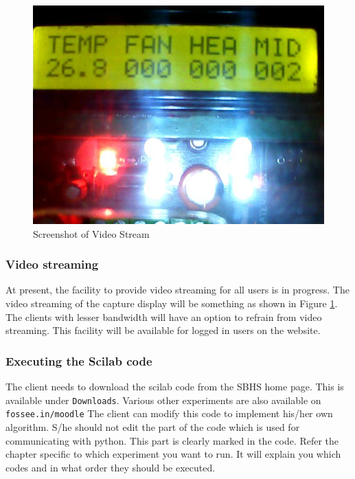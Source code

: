 \begin{figure}
  \centering
\includegraphics[width=0.7\linewidth]{IEEE-Chile/figures/display.jpg}
\caption{Screenshot of Video Stream}
\label{video}
\end{figure}
\subsubsection { Video streaming} At present, the facility to provide video streaming for all users is in progress. The video
streaming of the capture display will be something as shown in Figure \ref{video}. The clients with lesser bandwidth will have an option to refrain from video streaming. This facility will be available for logged in users on the website.

\subsubsection { Executing the Scilab code} The client needs to
download the scilab code from the SBHS home page. This is available
under {\tt Downloads}. Various other experiments are also available on {\tt fossee.in/moodle} The client can modify this code to implement
his/her own algorithm. S/he should not edit the part of the code which
is used for communicating with python. This part is clearly marked in
the code. Refer the chapter specific to which experiment you want to run. It will explain you which codes and in what order they should be executed.


